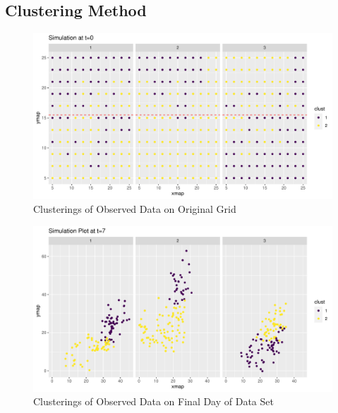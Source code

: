 \documentclass[12pt]{article}
\begin{document}
\hypertarget{clustering-method}{%
\subsection{Clustering Method}\label{clustering-method}}

\begin{figure}[tbp]

{\centering \includegraphics[width=\linewidth,]{spatio-temporal-model-arctic-sea-ice_files/figure-latex/plot-og-clus-1} 

}

\caption{Clusterings of Observed Data on Original Grid}\label{fig:plot-og-clus}
\end{figure}

\begin{figure}[tbp]

{\centering \includegraphics[width=\linewidth,]{spatio-temporal-model-arctic-sea-ice_files/figure-latex/all-clus-1} 

}

\caption{Clusterings of Observed Data on Final Day of Data Set}\label{fig:all-clus}
\end{figure}
\end{document}
